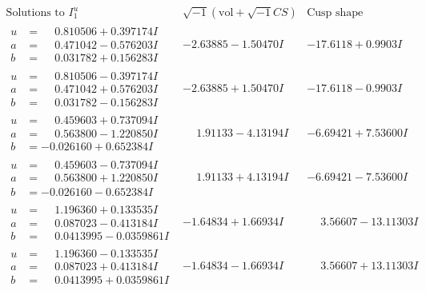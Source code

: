 \documentclass[1p]{elsarticle_modified}
\theoremstyle{definition}
\newcommand{\I}{\sqrt{-1}}
\begin{document}
$$\begin{array}{c|c|c}  
\text{Solutions to }I^u_{1}& \I (\text{vol} + \sqrt{-1}CS) & \text{Cusp shape}\\
 \hline 
\begin{aligned}
u &= \phantom{-}0.810506 + 0.397174 I \\
a &= \phantom{-}0.471042 - 0.576203 I \\
b &= \phantom{-}0.031782 + 0.156283 I\end{aligned}
 & -2.63885 - 1.50470 I & -17.6118 + 0.9903 I \\ \hline\begin{aligned}
u &= \phantom{-}0.810506 - 0.397174 I \\
a &= \phantom{-}0.471042 + 0.576203 I \\
b &= \phantom{-}0.031782 - 0.156283 I\end{aligned}
 & -2.63885 + 1.50470 I & -17.6118 - 0.9903 I \\ \hline\begin{aligned}
u &= \phantom{-}0.459603 + 0.737094 I \\
a &= \phantom{-}0.563800 - 1.220850 I \\
b &= -0.026160 + 0.652384 I\end{aligned}
 & \phantom{-}1.91133 - 4.13194 I & -6.69421 + 7.53600 I \\ \hline\begin{aligned}
u &= \phantom{-}0.459603 - 0.737094 I \\
a &= \phantom{-}0.563800 + 1.220850 I \\
b &= -0.026160 - 0.652384 I\end{aligned}
 & \phantom{-}1.91133 + 4.13194 I & -6.69421 - 7.53600 I \\ \hline\begin{aligned}
u &= \phantom{-}1.196360 + 0.133535 I \\
a &= \phantom{-}0.087023 - 0.413184 I \\
b &= \phantom{-}0.0413995 - 0.0359861 I\end{aligned}
 & -1.64834 + 1.66934 I & \phantom{-}3.56607 - 13.11303 I \\ \hline\begin{aligned}
u &= \phantom{-}1.196360 - 0.133535 I \\
a &= \phantom{-}0.087023 + 0.413184 I \\
b &= \phantom{-}0.0413995 + 0.0359861 I\end{aligned}
 & -1.64834 - 1.66934 I & \phantom{-}3.56607 + 13.11303 I \\ \hline\begin{aligned}

\end{aligned}
\end{array}$$
\end{document}
